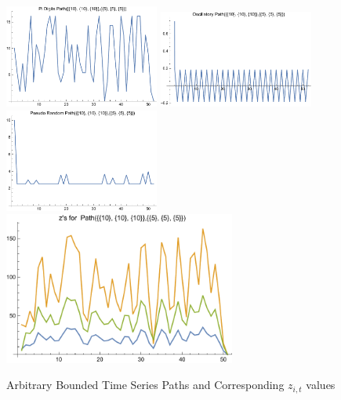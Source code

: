\documentclass[12pt]{article}
\begin{document}
\begin{figure}
  \centering
\includegraphics[width=2in]{piPath.pdf}
\includegraphics[width=2in]{oscillPath.pdf}
\includegraphics[width=2in]{pseudoPath.pdf}
\includegraphics[width=3in]{theZs.pdf}  
  
  \caption{Arbitrary Bounded Time Series Paths and Corresponding $z_{i,t}$ values}\label{arbpaths}
\end{figure}


  

\end{document}
